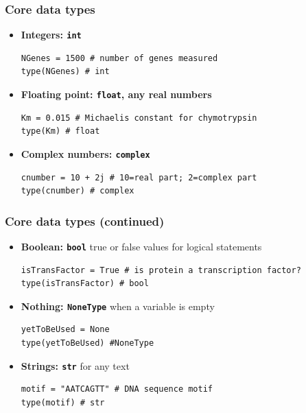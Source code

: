 \documentclass[xcolor=table]{beamer}
\begin{document}
\begin{frame}[fragile]
\frametitle{Core data types}

\begin{itemize}\addtolength{\itemsep}{0.5\baselineskip}

\item<1-> \textbf{Integers: \texttt{int}}\\
\begin{lstlisting}[style=python]
NGenes = 1500 # number of genes measured
type(NGenes) # int
\end{lstlisting}
	
\item<2-> \textbf{Floating point: \texttt{float}, any real numbers}
\begin{lstlisting}[style=python]
Km = 0.015 # Michaelis constant for chymotrypsin
type(Km) # float
\end{lstlisting}
	
\item<3-> \textbf{Complex numbers: \texttt{complex}}
\begin{lstlisting}[style=python]
cnumber = 10 + 2j # 10=real part; 2=complex part
type(cnumber) # complex
\end{lstlisting}

\end{itemize}

\end{frame}

\begin{frame}[fragile]
    \frametitle{Core data types (continued)}

\begin{itemize}\addtolength{\itemsep}{0.5\baselineskip}

\item<1-> \textbf{Boolean: \texttt{bool} } true or false values for logical statements
\begin{lstlisting}[style=python]
isTransFactor = True # is protein a transcription factor?
type(isTransFactor) # bool
\end{lstlisting}

\item<2-> \textbf{Nothing: \texttt{NoneType} } when a variable is empty
\begin{lstlisting}[style=python]
yetToBeUsed = None
type(yetToBeUsed) #NoneType
\end{lstlisting}

\item<3-> \textbf{Strings: \texttt{str}} for any text
\begin{lstlisting}[style=python]
motif = "AATCAGTT" # DNA sequence motif
type(motif) # str
\end{lstlisting}
\end{itemize}
\end{frame}
\end{document}
